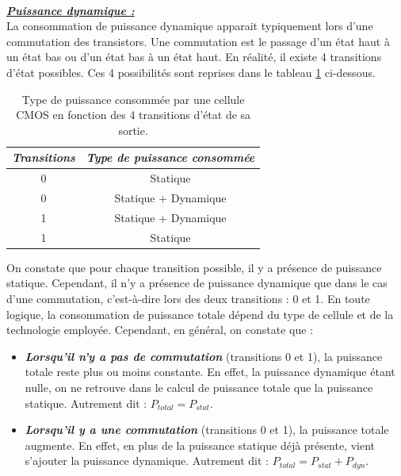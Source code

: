 \documentclass[oneside]{book}
\begin{document}
\hspace{-0.5 cm}
\vspace{0.6 cm} \\
\hspace{-0.5 cm}\underline{\textbf{\textit{Puissance dynamique :}}} \vspace{0.2 cm} \\
La consommation de puissance dynamique apparait typiquement lors d'une commutation des transistors. Une commutation est le passage d'un état haut à un état bas ou d'un état bas à un état haut. En réalité, il existe 4 transitions d'état possibles. Ces 4 possibilités sont reprises dans le tableau \ref{fig:dyn} ci-dessous. 
\begin{table}[htbp]
	\centering
	\begin{tabular}{|c|c|}
    		\hline
   		  \textit{Transitions} & \textit{Type de puissance consommée} \\ \hline 
   		  0  \rightarrow 0 & Statique \\ 
   		  0  \rightarrow 1 & Statique + Dynamique \\ 
		  1  \rightarrow 0 & Statique + Dynamique \\ 
   		  1  \rightarrow 1 & Statique \\ \hline
	\end{tabular}
    	\caption{Type de puissance consommée par une cellule CMOS en fonction des 4 transitions d'état de sa sortie.}
    	\label{fig:dyn} 
\end{table}

\hspace{-0.5 cm}On constate que pour chaque transition possible, il y a présence de puissance statique. Cependant, il n'y a présence de puissance dynamique que dans le cas d'une commutation, c'est-à-dire lors des deux transitions : 0 et 1.  En toute logique, la consommation de puissance totale dépend du type de cellule et de la technologie employée. Cependant, en général, on constate que : 
\begin{itemize}
\item \textbf{\textit{Lorsqu'il n'y a pas de commutation}} (transitions 0 et 1), la puissance totale reste plus ou moins constante. En effet, la puissance dynamique étant nulle, on ne retrouve dans le calcul de puissance totale que la puissance statique. Autrement dit : $P_{total}=P_{stat}$.
\item \textbf{\textit{Lorsqu'il y a une commutation}} (transitions 0 et 1), la puissance totale augmente. En effet, en plus de la puissance statique déjà présente, vient s'ajouter la puissance dynamique. Autrement dit : $P_{total}=P_{stat}+P_{dyn}$.
\end{itemize}
\end{document}

